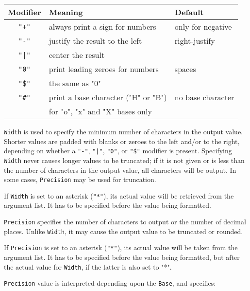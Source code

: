 \begin{flushleft}
\begin{tabular}{c|l|l}
\bf Modifier & \bf Meaning                     & \bf Default \\
\hline
 \verb'"+"' & always print a sign for numbers  & only for negative    \\
 \verb'"-"' & justify the result to the left   & right-justify        \\
 \verb'"|"' & center the result                &                      \\
 \verb'"0"' & print leading zeroes for numbers & spaces               \\
 \verb'"$"' & the same as "0"                  &                      \\
 \verb'"#"' & print a base character ("H" or "B") & no base character \\
            & for "o", "x" and "X" bases only  &
\end{tabular}
\end{flushleft}

{\tt Width} is used to specify the minimum number of characters in
the output value. Shorter values are padded with blanks or zeroes
to the left and/or to the right, depending on whether a \verb'"-"',
\verb'"|"', \verb'"0"', or \verb'"$"' modifier is present.
Specifying {\tt Width} never causes longer values to be truncated;
if it is not given or is less than the number of characters in the
output value, all characters will be output. In some cases,
{\tt Precision} may be used for truncation.

If {\tt Width} is set to an asterisk (\verb'"*"'), its actual value will be
retrieved from the argument list. It has to be specified before the value
being formatted.

{\tt Precision} specifies the number of characters to output or the number
of decimal places. Unlike {\tt Width}, it may cause the output value
to be truncated or rounded.

If {\tt Precision} is set to an asterisk (\verb'"*"'), its actual value will
be taken from the argument list. It has to be specified before the value being
formatted, but after the actual value for {\tt Width}, if the latter is also set
to "*".

{\tt Precision} value is interpreted depending upon the {\tt Base},
and specifies:

